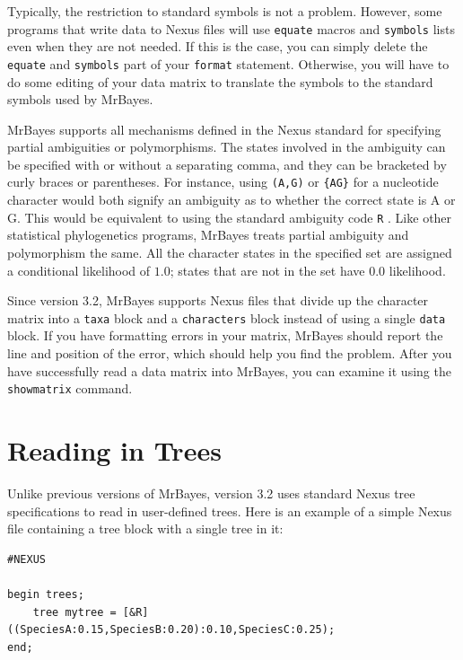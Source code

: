 \documentclass[12pt]{book}
\newcommand{\ttt}[1]{\texttt{#1} }
\begin{document}
Typically, the restriction to standard symbols is not a problem. However, some programs that write
data to Nexus files will use \ttt{equate} macros and \ttt{symbols} lists even when they are not
needed. If this is the case, you can simply delete the \ttt{equate} and \ttt{symbols} part of your
\ttt{format} statement. Otherwise, you will have to do some editing of your data matrix to
translate the symbols to the standard symbols used by MrBayes.

MrBayes supports all mechanisms defined in the Nexus standard for specifying partial ambiguities or
polymorphisms. The states involved in the ambiguity can be specified with or without a separating
comma, and they can be bracketed by curly braces or parentheses. For instance, using \ttt{(A,G)} or
\ttt{\{AG\}} for a nucleotide character would both signify an ambiguity as to whether the correct
state is A or G. This would be equivalent to using the standard ambiguity code \ttt{R}. Like other
statistical phylogenetics programs, MrBayes treats partial ambiguity and polymorphism the same. All
the character states in the specified set are assigned a conditional likelihood of $1.0$; states
that are not in the set have $0.0$ likelihood.

Since version 3.2, MrBayes supports Nexus files that divide up the character matrix into a
\ttt{taxa} block and a \ttt{characters} block instead of using a single \ttt{data} block. If you
have formatting errors in your matrix, MrBayes should report the line and position of the error,
which should help you find the problem.  After you have successfully read a data matrix into
MrBayes, you can examine it using the \ttt{showmatrix} command.

\section{Reading in Trees}
Unlike previous versions of MrBayes, version 3.2 uses standard Nexus tree specifications to read in
user-defined trees. Here is an example of a simple Nexus file containing a tree block with a single
tree in it:

\footnotesize
\begin{singlespacing}
\begin{verbatim}
#NEXUS

begin trees;
    tree mytree = [&R] ((SpeciesA:0.15,SpeciesB:0.20):0.10,SpeciesC:0.25);
end;
\end{verbatim}
\end{singlespacing}
\normalsize
\end{document}
